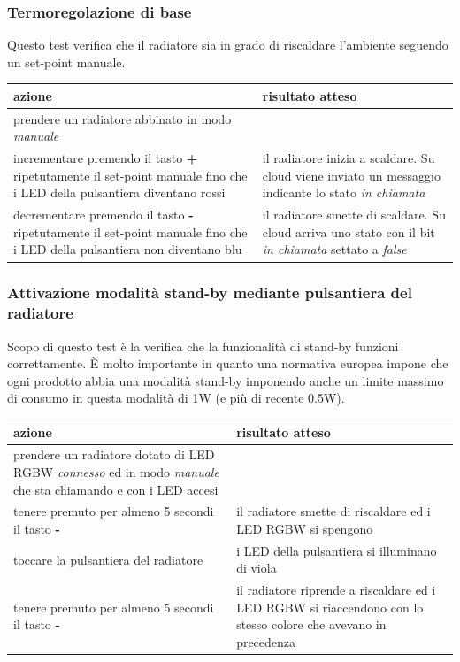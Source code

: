 \documentclass[a4paper,titlepage]{article}
\begin{document}
\subsubsection{Termoregolazione di base}

Questo test verifica che il radiatore sia in grado di riscaldare l'ambiente seguendo un set-point manuale.

\begin{center}
\begin{tabular}{| p{5cm} | p{5cm} |}
    \hline \textbf{azione} & \textbf{risultato atteso} \\
    \hline prendere un radiatore abbinato in modo \textit{manuale} & \\
    \hline incrementare premendo il tasto \textbf{+} ripetutamente il set-point manuale fino che i LED della pulsantiera diventano rossi & il radiatore inizia a scaldare. Su cloud viene inviato un messaggio indicante lo stato \textit{in chiamata} \\
    \hline decrementare premendo il tasto \textbf{-} ripetutamente il set-point manuale fino che i LED della pulsantiera non diventano blu & il radiatore smette di scaldare. Su cloud arriva uno stato con il bit \textit{in chiamata} settato a \textit{false} \\
    \hline
\end{tabular}
\end{center}

\subsubsection{Attivazione modalità stand-by mediante pulsantiera del radiatore}

Scopo di questo test è la verifica che la funzionalità di stand-by funzioni correttamente.
È molto importante in quanto una normativa europea impone che ogni prodotto abbia una
modalità stand-by imponendo anche un limite massimo di consumo in questa modalità di 1W
(e più di recente 0.5W).

\begin{center}
\begin{tabular}{| p{5cm} | p{5cm} |}
    \hline \textbf{azione} & \textbf{risultato atteso} \\
    \hline prendere un radiatore dotato di LED RGBW \textit{connesso} ed in modo \textit{manuale} che sta chiamando e con i LED accesi & \\
    \hline tenere premuto per almeno 5 secondi il tasto \textbf{-} & il radiatore smette di riscaldare ed i LED RGBW si spengono \\
    \hline toccare la pulsantiera del radiatore & i LED della pulsantiera si illuminano di viola \\
    \hline tenere premuto per almeno 5 secondi il tasto \textbf{-} & il radiatore riprende a riscaldare ed i LED RGBW si riaccendono con lo stesso colore che avevano in precedenza \\
    \hline
\end{tabular}
\end{center}
\end{document}
